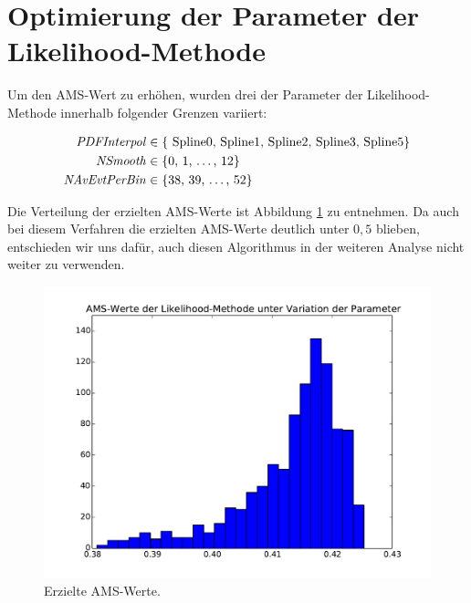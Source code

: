 \section{Optimierung der Parameter der Likelihood-Methode}
Um den AMS-Wert zu erhöhen, wurden drei der Parameter der Likelihood-Methode innerhalb folgender Grenzen variiert:

\begin{equation}
\begin{split}
\mbox{\textit{PDFInterpol}} &\in \{ \mbox{ Spline0,  Spline1, Spline2,  Spline3, Spline5}  \}  \\
 \mbox{\textit{NSmooth}} &\in \{ \mbox{0, 1, \ldots, 12} \} \\
  \mbox{\textit{NAvEvtPerBin}} &\in \{ \mbox{38, 39, \ldots, 52} \} \\
\end{split}
\end{equation}

Die Verteilung der erzielten AMS-Werte ist  Abbildung \ref{fig:likelihood_hist} zu entnehmen.
Da auch bei diesem Verfahren die erzielten AMS-Werte deutlich unter $0,5$ blieben, entschieden wir uns dafür, auch diesen Algorithmus in der weiteren Analyse nicht weiter zu verwenden.


\begin{figure}[htp]
\begin{center}
  \includegraphics[width=0.7\linewidth]{sections/parameter_optimization_likelihood/likelihood_AMS_hist.pdf}
 \caption[Histogramm der erzielten AMS-Werte]{Erzielte AMS-Werte.}
\label{fig:likelihood_hist}
\end{center}
\end{figure}